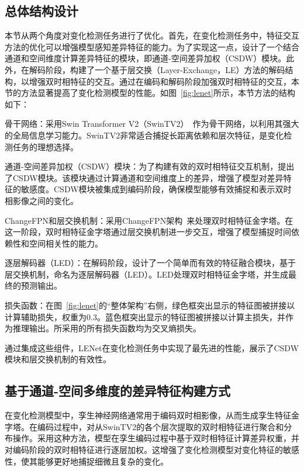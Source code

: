 \subsection{总体结构设计}
本节从两个角度对变化检测任务进行了优化。首先，在变化检测任务中，特征交互方法的优化可以增强模型感知差异特征的能力。为了实现这一点，设计了一个结合通道和空间维度计算差异特征的模块，即通道-空间差异加权（CSDW）模块。此外，在解码阶段，构建了一个基于层交换（Layer-Exchange，LE）方法的解码结构，以增强双时相特征的交互。通过在编码和解码阶段加强双时相特征的交互，本节的方法显著提高了变化检测模型的性能。如图~\ref{fig:lenet}所示，本节方法的结构如下：

骨干网络：采用Swin Transformer V2（SwinTV2）~\cite{liu_swin_2021-5}作为骨干网络，以利用其强大的全局信息学习能力。SwinTV2非常适合捕捉长距离依赖和层次特征，是变化检测任务的理想选择。

通道-空间差异加权（CSDW）模块：为了构建有效的双时相特征交互机制，提出了CSDW模块。该模块通过计算通道和空间维度上的差异，增强了模型对差异特征的敏感度。CSDW模块被集成到编码阶段，确保模型能够有效捕捉和表示双时相影像之间的变化。

ChangeFPN和层交换机制：采用ChangeFPN架构~\cite{dong_efficientcd_2024}来处理双时相特征金字塔。在这一阶段，双时相特征金字塔通过层交换机制进一步交互，增强了模型捕捉时间依赖性和空间相关性的能力。

逐层解码器（LED）：在解码阶段，设计了一个简单而有效的特征融合模块，基于层交换机制，命名为逐层解码器（LED）。LED处理双时相特征金字塔，并生成最终的预测输出。

损失函数：在图~\ref{fig:lenet}的“整体架构”右侧，绿色框突出显示的特征图被拼接以计算辅助损失，权重为0.3。蓝色框突出显示的特征图被拼接以计算主损失，并作为推理输出。所采用的所有损失函数均为交叉熵损失。

通过集成这些组件，LENet在变化检测任务中实现了最先进的性能，展示了CSDW模块和层交换机制的有效性。

\subsection{基于通道-空间多维度的差异特征构建方式}
在变化检测模型中，孪生神经网络通常用于编码双时相影像，从而生成孪生特征金字塔。在编码过程中，对从SwinTV2的各个层次提取的双时相特征进行聚合和分布操作。采用这种方法，模型在孪生编码过程中基于双时相特征计算差异权重，并对编码阶段的双时相特征进行逐层加权。这增强了变化检测模型对变化特征的敏感性，使其能够更好地捕捉细微且复杂的变化。

